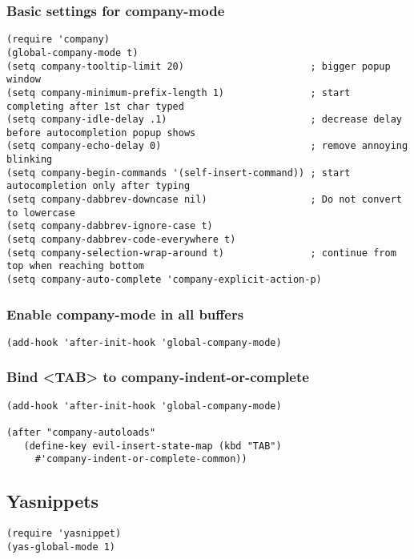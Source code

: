 \documentclass[11pt]{article}
\begin{document}
\subsubsection*{Basic settings for company-mode}
\label{sec:org24857d8}
\begin{verbatim}
(require 'company)
(global-company-mode t)
(setq company-tooltip-limit 20)                      ; bigger popup window
(setq company-minimum-prefix-length 1)               ; start completing after 1st char typed
(setq company-idle-delay .1)                         ; decrease delay before autocompletion popup shows
(setq company-echo-delay 0)                          ; remove annoying blinking
(setq company-begin-commands '(self-insert-command)) ; start autocompletion only after typing
(setq company-dabbrev-downcase nil)                  ; Do not convert to lowercase
(setq company-dabbrev-ignore-case t)
(setq company-dabbrev-code-everywhere t)
(setq company-selection-wrap-around t)               ; continue from top when reaching bottom
(setq company-auto-complete 'company-explicit-action-p)
\end{verbatim}

\subsubsection*{Enable company-mode in all buffers}
\label{sec:orgdb27fce}
\begin{verbatim}
(add-hook 'after-init-hook 'global-company-mode)
\end{verbatim}

\subsubsection*{Bind <TAB> to company-indent-or-complete}
\label{sec:org77bdebe}
\begin{verbatim}
(add-hook 'after-init-hook 'global-company-mode)

(after "company-autoloads"
   (define-key evil-insert-state-map (kbd "TAB")
     #'company-indent-or-complete-common))
\end{verbatim}


\subsection*{Yasnippets}
\label{sec:orgd3dc01e}

\begin{verbatim}
(require 'yasnippet)
(yas-global-mode 1)
\end{verbatim}
\end{document}
